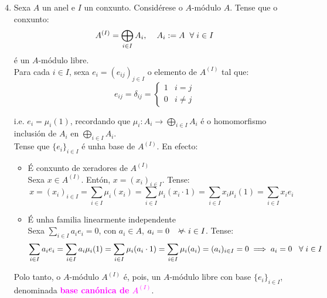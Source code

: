 \documentclass[twoside]{report}
\newcommand{\magbf}[1]{\textcolor{magenta}{\textbf{#1}}} %
\newcommand{\almostall}{\mathrel{\vee\mkern-19mu\frown}} %
\theoremstyle{mystyle}
\begin{document}
\begin{enumerate}
    \setcounter{enumi}{3}
    \item Sexa $A$ un anel e $I$ un conxunto. Considérese o $A$-módulo $A$. Tense que o conxunto:
    $$A^{(I)} = \displaystyle \bigoplus_{i \in I} A_{i}, \hspace{4mm} A_{i} := A \hspace{2mm} \forall \hspace{1mm} i \in I$$
    é un $A$-módulo libre.\\
    
    Para cada $i \in I$, sexa $e_{i} = (e_{ij})_{j \in I}$ o elemento de $A^{(I)}$ tal que:
    $$e_{ij} = \delta_{ij} = 
    \begin{cases}
    1 & i = j\\
    0 & i \neq j
    \end{cases}$$
    
    i.e. $e_{i} = \mu_{i}(1)$, recordando que $\mu_{i}: A_{i} \longrightarrow \displaystyle \bigoplus_{i \in I} A_{i}$ é o homomorfismo inclusión de $A_{i}$ en $\displaystyle \bigoplus_{i \in I} A_{i}$.\\
    
    Tense que $\{e_{i}\}_{i \in I}$ é unha base de $A^{(I)}$. En efecto:
    
    \begin{itemize}
        \item É conxunto de xeradores de $A^{(I)}$\\
        
        Sexa $x \in A^{(I)}$. Entón, $x = (x_{i})_{i \in I}$. Tense:
        $$x = (x_{i})_{i \in I} = \displaystyle \sum_{i \in I} \mu_{i}(x_{i}) = \displaystyle \sum_{i \in I} \mu_{i}(x_{i} \cdot 1) = \displaystyle \sum_{i \in I} x_{i} \mu_{i}(1) = \displaystyle \sum_{i \in I} x_{i}e_{i}$$
        
        \item É unha familia linearmente independente\\
        
        Sexa $\displaystyle \sum_{i \in I} a_{i}e_{i} = 0$, con $a_{i} \in A$, $a_{i} = 0 \hspace{3mm} \almostall i \in I$. Tense:
        $$\displaystyle \sum_{i \in I} a_{i}e_{i} = \displaystyle \sum_{i \in I} a_{i} \mu_{i}(1) = \displaystyle \sum_{i \in I} \mu_{i}(a_{i} \cdot 1) = \displaystyle \sum_{i \in I} \mu_{i}(a_{i}) = (a_{i})_{i \in I} = 0 \implies a_{i} = 0 \hspace{3mm} \forall \hspace{1mm} i \in I$$
    \end{itemize}
    
    Polo tanto, o $A$-módulo $A^{(I)}$ é, pois, un $A$-módulo libre con base $\{e_{i}\}_{i \in I}$, denominada \magbf{base canónica de $A^{(I)}$}.\\
\end{enumerate}
\end{document}
